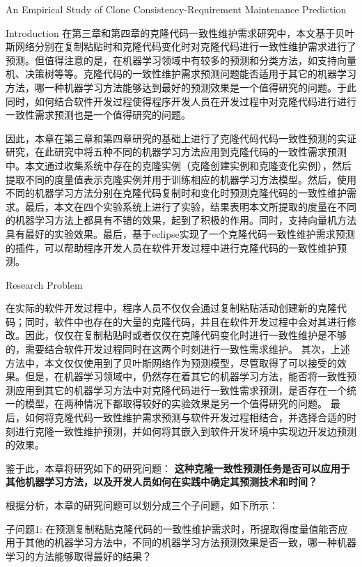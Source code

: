 
{An Empirical Study of Clone Consistency-Requirement Maintenance Prediction}


{Introduction}
在第三章和第四章的克隆代码一致性维护需求研究中，本文基于贝叶斯网络分别在复制粘贴时和克隆代码变化时对克隆代码进行一致性维护需求进行了预测。但值得注意的是，在机器学习领域中有较多的预测和分类方法，如支持向量机、决策树等等。克隆代码的一致性维护需求预测问题能否适用于其它的机器学习方法，哪一种机器学习方法能够达到最好的预测效果是一个值得研究的问题。于此同时，如何结合软件开发过程使得程序开发人员在开发过程中对克隆代码进行进行一致性需求预测也是一个值得研究的问题。

因此，本章在第三章和第四章研究的基础上进行了克隆代码代码一致性预测的实证研究，在此研究中将五种不同的机器学习方法应用到克隆代码的一致性需求预测中。本文通过收集系统中存在的克隆实例（克隆创建实例和克隆变化实例），然后提取不同的度量值表示克隆实例并用于训练相应的机器学习方法模型。然后，使用不同的机器学习方法分别在克隆代码复制时和变化时预测克隆代码的一致性维护需求。最后，本文在四个实验系统上进行了实验，结果表明本文所提取的度量在不同的机器学习方法上都具有不错的效果，起到了积极的作用。同时，支持向量机方法具有最好的实验效果。最后，基于eclipse实现了一个克隆代码一致性维护需求预测的插件，可以帮助程序开发人员在软件开发过程中进行克隆代码的一致性维护预测。

{Research Problem}

在实际的软件开发过程中，程序人员不仅仅会通过复制粘贴活动创建新的克隆代码；同时，软件中也存在的大量的克隆代码，并且在软件开发过程中会对其进行修改。因此，仅仅在复制粘贴时或者仅仅在克隆代码变化时进行一致性维护是不够的，需要结合软件开发过程同时在这两个时刻进行一致性需求维护。
其次，上述方法中，本文仅仅使用到了贝叶斯网络作为预测模型，尽管取得了可以接受的效果。但是，在机器学习领域中，仍然存在着其它的机器学习方法，能否将一致性预测应用到其它的机器学习方法中对克隆代码进行一致性需求预测，是否存在一个统一的模型，在两种情况下都取得较好的实验效果是另一个值得研究的问题。
最后，如何将克隆代码一致性维护需求预测与软件开发过程相结合，并选择合适的时刻进行克隆一致性维护预测，并如何将其嵌入到软件开发环境中实现边开发边预测的效果。

鉴于此，本章将研究如下的研究问题：
{\bf 这种克隆一致性预测任务是否可以应用于其他机器学习方法，以及开发人员如何在实践中确定其预测技术和时间？}

根据分析，本章的研究问题可以划分成三个子问题，如下所示：

子问题1: 在预测复制粘贴克隆代码的一致性维护需求时，所提取得度量值能否应用于其他的机器学习方法中，不同的机器学习方法预测效果是否一致，哪一种机器学习的方法能够取得最好的结果？

